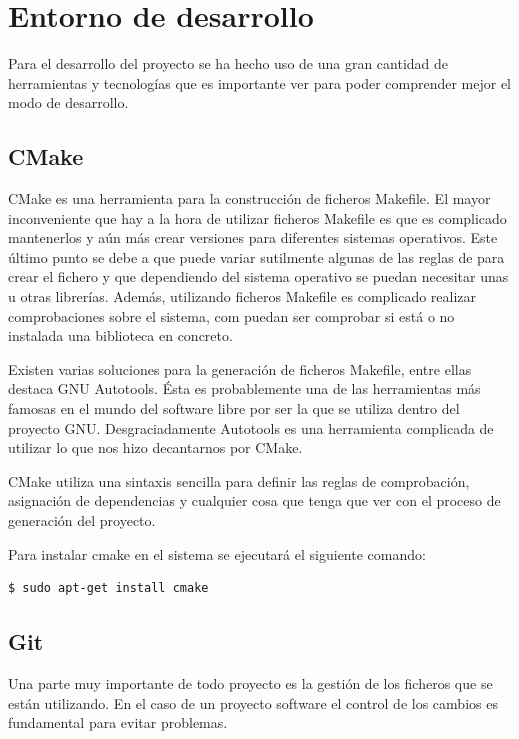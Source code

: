 \chapter{Entorno de desarrollo}\label{chap:entorno}

Para el desarrollo del proyecto se ha hecho uso de una gran cantidad de herramientas y tecnologías que es importante ver para poder comprender mejor el modo de desarrollo.

\section{CMake}

CMake es una herramienta para la construcción de ficheros Makefile. El mayor inconveniente que hay a la hora de utilizar ficheros Makefile es que es complicado mantenerlos y aún más crear versiones para diferentes sistemas operativos. Este último punto se debe a que puede variar sutilmente algunas de las reglas de para crear el fichero y que dependiendo del sistema operativo se puedan necesitar unas u otras librerías. Además, utilizando ficheros Makefile es complicado realizar comprobaciones sobre el sistema, com puedan ser comprobar si está o no instalada una biblioteca en concreto.

Existen varias soluciones para la generación de ficheros Makefile, entre ellas destaca GNU Autotools. Ésta es probablemente una de las herramientas más famosas en el mundo del software libre por ser la que se utiliza dentro del proyecto GNU. Desgraciadamente Autotools es una herramienta complicada de utilizar lo que nos hizo decantarnos por CMake.

CMake utiliza una sintaxis sencilla para definir las reglas de comprobación, asignación de dependencias y cualquier cosa que tenga que ver con el proceso de generación del proyecto.

Para instalar cmake en el sistema se ejecutará el siguiente comando:

\begin{verbatim}
$ sudo apt-get install cmake
\end{verbatim}

\section{Git}

Una parte muy importante de todo proyecto es la gestión de los ficheros que se están utilizando. En el caso de un proyecto software el control de los cambios es fundamental para evitar problemas.

